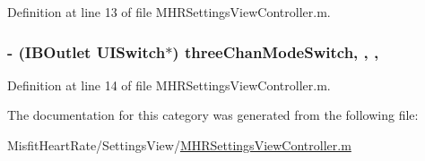 Definition at line 13 of file M\+H\+R\+Settings\+View\+Controller.\+m.

\hypertarget{category_m_h_r_settings_view_controller_07_08_a1895b1abc4ef23d82293f905fbd27468}{
\subsubsection[{three\+Chan\+Mode\+Switch}]{\setlength{\rightskip}{0pt plus 5cm}-\/ (I\+B\+Outlet U\+I\+Switch$\ast$) three\+Chan\+Mode\+Switch\hspace{0.3cm}{\ttfamily [read]}, {\ttfamily [write]}, {\ttfamily [nonatomic]}, {\ttfamily [weak]}}}\label{category_m_h_r_settings_view_controller_07_08_a1895b1abc4ef23d82293f905fbd27468}


Definition at line 14 of file M\+H\+R\+Settings\+View\+Controller.\+m.



The documentation for this category was generated from the following file\+:\begin{DoxyCompactItemize}
\item 
Misfit\+Heart\+Rate/\+Settings\+View/\hyperlink{_m_h_r_settings_view_controller_8m}{M\+H\+R\+Settings\+View\+Controller.\+m}\end{DoxyCompactItemize}

